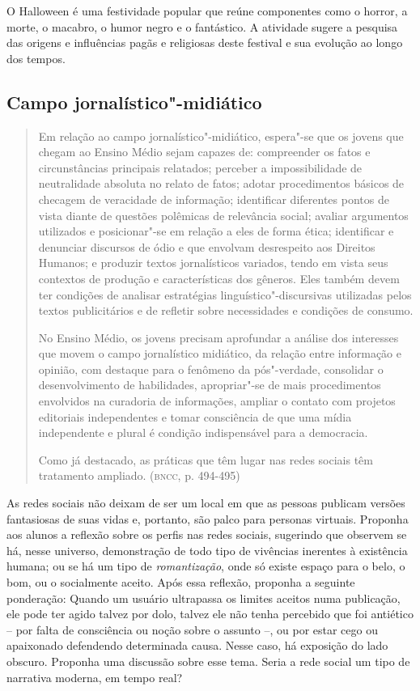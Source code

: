 \documentclass[12pt]{extarticle}
\begin{document}
O Halloween é uma festividade popular que reúne componentes como o
horror, a morte, o macabro, o humor negro e o fantástico. A atividade
sugere a pesquisa das origens e influências pagãs e religiosas deste
festival e sua evolução ao longo dos tempos.

\subsection{Campo jornalístico"-midiático}

\begin{quote}
Em relação ao campo jornalístico"-midiático, espera"-se que os jovens
que chegam ao Ensino Médio sejam capazes de: compreender os fatos e
circunstâncias principais relatados; perceber a impossibilidade de
neutralidade absoluta no relato de fatos; adotar procedimentos básicos
de checagem de veracidade de informação; identificar diferentes pontos
de vista diante de questões polêmicas de relevância social; avaliar
argumentos utilizados e posicionar"-se em relação a eles de forma ética;
identificar e denunciar discursos de ódio e que envolvam desrespeito aos
Direitos Humanos; e produzir textos jornalísticos variados, tendo em
vista seus contextos de produção e características dos gêneros. Eles
também devem ter condições de analisar estratégias
linguístico"-discursivas utilizadas pelos textos publicitários e de
refletir sobre necessidades e condições de consumo.

No Ensino Médio, os jovens precisam aprofundar a análise dos interesses
que movem o campo jornalístico midiático, da relação entre informação e
opinião, com destaque para o fenômeno da pós"-verdade, consolidar o
desenvolvimento de habilidades, apropriar"-se de mais procedimentos
envolvidos na curadoria de informações, ampliar o contato com projetos
editoriais independentes e tomar consciência de que uma mídia
independente e plural é condição indispensável para a democracia.

Como já destacado, as práticas que têm lugar nas redes sociais têm
tratamento ampliado. (\textsc{bncc}, p. 494-495)
\end{quote}

As redes sociais não deixam de ser um local em que as pessoas publicam
versões fantasiosas de suas vidas e, portanto, são palco para personas
virtuais. Proponha aos alunos a reflexão sobre os perfis nas redes
sociais, sugerindo que observem se há, nesse universo, demonstração de
todo tipo de vivências inerentes à existência humana; ou se há um tipo
de \emph{romantização}, onde só existe espaço para o belo, o bom, ou o
socialmente aceito. Após essa reflexão, proponha a seguinte
ponderação: Quando um usuário ultrapassa os limites aceitos numa
publicação, ele pode ter agido talvez por dolo, talvez ele não tenha
percebido que foi antiético -- por falta de consciência ou noção sobre
o assunto --, ou por estar cego ou apaixonado defendendo determinada
causa. Nesse caso, há exposição do lado obscuro. Proponha uma
discussão sobre esse tema. Seria a rede social um tipo de narrativa
moderna, em tempo real?
\end{document}
